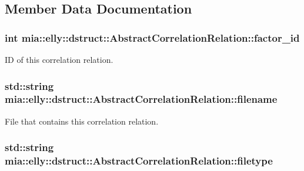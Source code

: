 \subsection{Member Data Documentation}
\hypertarget{classmia_1_1elly_1_1dstruct_1_1_abstract_correlation_relation_a3747a084efa5095d4808819bb012ae65}{
\subsubsection[{factor\-\_\-id}]{\setlength{\rightskip}{0pt plus 5cm}int mia\-::elly\-::dstruct\-::\-Abstract\-Correlation\-Relation\-::factor\-\_\-id}}\label{classmia_1_1elly_1_1dstruct_1_1_abstract_correlation_relation_a3747a084efa5095d4808819bb012ae65}
I\-D of this correlation relation. \hypertarget{classmia_1_1elly_1_1dstruct_1_1_abstract_correlation_relation_a21e302ad723c9e0c99eb81c5bc420779}{
\subsubsection[{filename}]{\setlength{\rightskip}{0pt plus 5cm}std\-::string mia\-::elly\-::dstruct\-::\-Abstract\-Correlation\-Relation\-::filename}}\label{classmia_1_1elly_1_1dstruct_1_1_abstract_correlation_relation_a21e302ad723c9e0c99eb81c5bc420779}
File that contains this correlation relation. \hypertarget{classmia_1_1elly_1_1dstruct_1_1_abstract_correlation_relation_ae96b4f7de4d2e53b3a3ea38b14e90838}{
\subsubsection[{filetype}]{\setlength{\rightskip}{0pt plus 5cm}std\-::string mia\-::elly\-::dstruct\-::\-Abstract\-Correlation\-Relation\-::filetype}}\label{classmia_1_1elly_1_1dstruct_1_1_abstract_correlation_relation_ae96b4f7de4d2e53b3a3ea38b14e90838}
